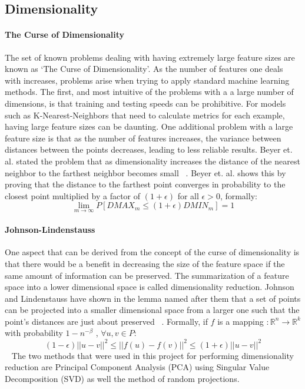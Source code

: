 \subsection{Dimensionality}
\paragraph{The Curse of Dimensionality} %
\label{par:paragraph_name}
The set of known problems dealing with having extremely large feature sizes are known as `The Curse of Dimensionality'. As the number of features one deals with increases, problems arise when trying to apply standard machine learning methods. The first, and most intuitive of the problems with a a large number of dimensions, is that training and testing speeds can be prohibitive. For models such as K-Nearest-Neighbors that need to calculate metrics for each example, having large feature sizes can be daunting. One additional problem with a large feature size is that as the number of features increases, the variance between distances between the points decreases, leading to less reliable results. Beyer et. al. stated the problem that as dimensionality increases the distance of the nearest neighbor to the farthest neighbor becomes small ~\cite{beyer1999nearest}. Beyer et. al. shows this by proving that the distance to the farthest point converges in probability to the closest point multiplied by a factor of $(1+\epsilon)$ for all $\epsilon > 0$, formally:
\begin{equation}
	\lim_{m\rightarrow \infty} P[DMAX_m \le (1+\epsilon)DMIN_m]=1
\end{equation}
\paragraph{Johnson-Lindenstauss} %
\label{par:johnson_lindenstauss}
One aspect that can be derived from the concept of the curse of dimensionality is that there would be a benefit in decreasing the size of the feature space if the same amount of information can be preserved. The summarization of a feature space into a lower dimensional space is called dimensionality reduction. Johnson and Lindenstauss have shown in the lemma named after them that a set of points can be projected into a smaller dimensional space from a larger one such that the point's distances are just about preserved ~\cite{johnson1984extensions}. Formally, if $f$ is a mapping $:\mathbb{R}^n \rightarrow \mathbb{R}^k$ with probability $1-n^{-\beta}$ ,  $\forall u,v \in P$:
\begin{equation}
	(1 - \epsilon)||u - v||^2 \le ||f(u)-f(v)||^2 \le (1+\epsilon)||u-v||^2
\end{equation}  ~\cite{achlioptas2001database} The two methods that were used in this project for performing dimensionality reduction are Principal Component Analysis (PCA) using Singular Value Decomposition (SVD) as well the method of random projections.
